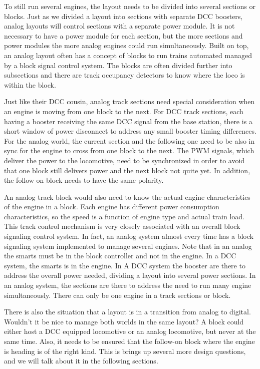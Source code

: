 To still run several engines, the layout needs to be divided into several sections or blocks. Just as we divided a layout into sections with separate DCC boosters, analog layouts will control sections with a separate power module. It is not necessary to have a power module for each section, but the more sections and power modules the more analog engines could run simultaneously. Built on top, an analog layout often has a concept of blocks to run trains automated managed by a block signal control system. The blocks are often divided further into subsections and there are track occupancy detectors to know where the loco is within the block.

Just like their DCC cousin, analog track sections need special consideration when an engine is moving from one block to the next. For DCC track sections, each having a booster receiving the same DCC signal from the base station, there is a short window of power disconnect to address any small booster timing differences. For the analog world, the current section and the following one need to be also in sync for the engine to cross from one block to the next. The PWM signals, which deliver the power to the locomotive, need to be synchronized in order to avoid that one block still delivers power and the next block not quite yet. In addition, the follow on block needs to have the same polarity.

An analog track block would also need to know the actual engine characteristics of the engine in a block. Each engine has different power consumption characteristics, so the speed is a function of engine type and actual train load. This track control mechanism is very closely associated with an overall block signaling control system. In fact, an analog system almost every time has a block signaling system implemented to manage several engines. Note that in an analog the smarts must be in the block controller and not in the engine. In a DCC system, the smarts is in the engine. In A DCC system the booster are there to address the overall power needed, dividing a layout into several power sections. In an analog system, the sections are there to address the need to run many engine simultaneously. There can only be one engine in a track sections or block.

There is also the situation that a layout is in a transition from analog to digital. Wouldn't it be nice to manage both worlds in the same layout? A block could either host a DCC equipped locomotive or an analog locomotive, but never at the same time. Also, it needs to be ensured that the follow-on block where the engine is heading is of the right kind. This is brings up several more design questions, and we will talk about it in the following sections.

